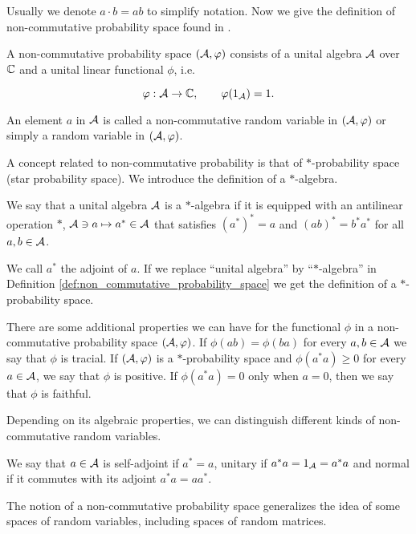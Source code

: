 Usually we denote $a\cdot b = ab$ to simplify notation. Now we give the definition of non-commutative probability space found in \cite{book:nica_speicher}.

\begin{definition} \label{def:non_commutative_probability_space}
    A non-commutative probability space $(\mathcal A,\varphi)$ consists of a unital algebra $\mathcal A$ over $\mathbb C$ and a unital linear functional $\phi$, i.e.

    \begin{equation*}
        \varphi : \mathcal A \to \mathbb C, \qquad \varphi(1_\mathcal A) = 1.
    \end{equation*}
\end{definition}

    An element $a$ in $\mathcal A$ is called a non-commutative random variable in $(\mathcal A, \varphi)$ or simply a random variable in $(\mathcal A,\varphi)$.

    A concept related to non-commutative probability is that of $*$-probability space (star probability space). We introduce the definition of a $*$-algebra.

    \begin{definition}[$*$-Algebra]
        We say that a unital algebra $\mathcal A$ is a $*$-algebra if it is equipped with an antilinear operation $*$, $\mathcal A \ni a \mapsto a^* \in \mathcal A$ that satisfies $(a^*)^* = a$ and $(ab)^* = b^* a^*$ for all $a,b \in \mathcal A$.
    \end{definition}

    We call $a^*$ the adjoint of $a$. If we replace ``unital algebra'' by ``$*$-algebra'' in Definition \ref{def:non_commutative_probability_space} we get the definition of a $*$-probability space.

    There are some additional properties we can have for the functional $\phi$ in a non-commutative probability space $(\mathcal A,\varphi)$. If $\phi(ab) = \phi(ba)$ for every $a,b \in \mathcal A$ we say that $\phi$ is tracial. If $(\mathcal A, \varphi)$ is a $*$-probability space and $\phi(a^*a)\ge 0$ for every $a\in \mathcal A$, we say that $\phi$ is positive. If $\phi(a^*a)=0$ only when $a=0$, then we say that $\phi$ is faithful.

    Depending on its algebraic properties, we can distinguish different kinds of non-commutative random variables. 
    
    We say that $a \in \mathcal A$ is self-adjoint if $a^* = a$, unitary if $a^*a = 1_\mathcal A = a^*a$ and normal if it commutes with its adjoint $a^*a = aa^*$.

    The notion of a non-commutative probability space generalizes the idea of some spaces of random variables, including spaces of random matrices.

